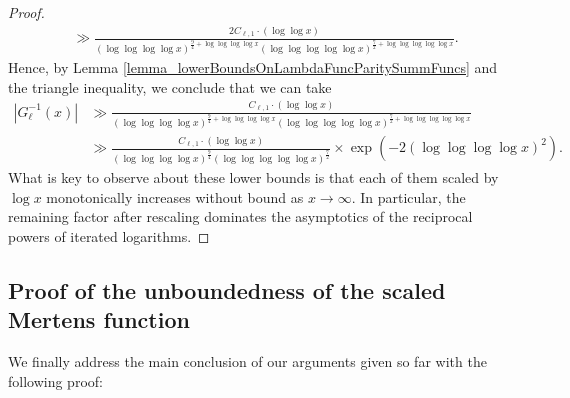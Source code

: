 \documentclass[11pt,reqno,a4letter]{article}
\numberwithin{figure}{section}
\numberwithin{table}{section}
\theoremstyle{plain}
\numberwithin{theorem}{section}
\theoremstyle{definition}
\newcommand{\SuccSim}[0]{\overset{_{\scriptsize{\blacktriangle}}}{\succsim}}
\renewcommand{\SuccSim}[0]{\ensuremath{\gg}}
\begin{document}
\begin{proof}
\begin{align}
     & \gg \frac{2 C_{\ell,1} \cdot (\log\log x)}{ 
     (\log\log\log\log x)^{\frac{9}{4} + \log\log\log\log x} 
     (\log\log\log\log\log x)^{\frac{7}{2} + \log\log\log\log\log x}}. 
\end{align} 
Hence, by 
Lemma \ref{lemma_lowerBoundsOnLambdaFuncParitySummFuncs} and the triangle inequality, 
we conclude that we can take 
\begin{align*} 
\left\lvert G_{\ell}^{-1}\left(x\right) \right\rvert
     & \SuccSim 
     \frac{C_{\ell,1} \cdot (\log\log x)}{(\log\log\log\log x)^{\frac{9}{4} + \log\log\log\log x} 
     (\log\log\log\log\log x)^{\frac{7}{2} + \log\log\log\log\log x}} \\ 
     & \gg \frac{C_{\ell,1} \cdot (\log\log x)}{(\log\log\log\log x)^{\frac{9}{4}} 
     (\log\log\log\log\log x)^{\frac{7}{2}}} \times 
     \exp\left(-2 (\log\log\log\log x)^2\right). 
\end{align*} 
What is key to observe about these lower bounds is that each of them scaled by $\log x$ 
monotonically increases without bound as $x \rightarrow \infty$. In particular, the remaining factor 
after rescaling dominates the asymptotics of the reciprocal powers of iterated logarithms. 
\end{proof} 

\subsection{Proof of the unboundedness of the scaled Mertens function}
\label{subSection_TheCoreResultProof} 

We finally address the main conclusion of our arguments given so far with the 
following proof: 
\end{document}
